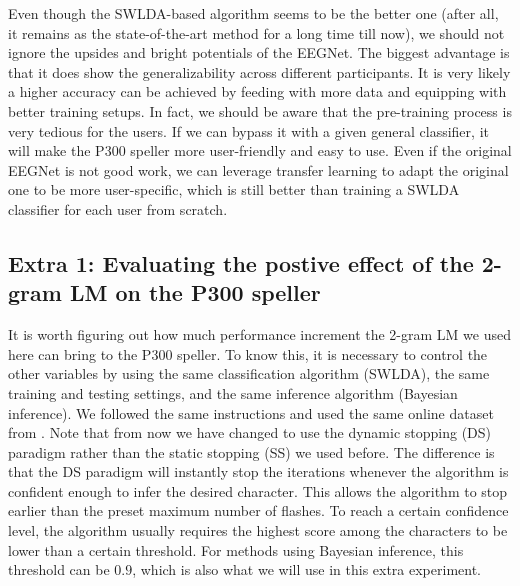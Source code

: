 \documentclass{article}
\begin{document}
\vspace{-3mm}
Even though the SWLDA-based algorithm seems to be the better one (after all, it remains as the state-of-the-art method for a long time till now), we should not ignore the upsides and bright potentials of the EEGNet. The biggest advantage is that it does show the generalizability across different participants. It is very likely a higher accuracy can be achieved by feeding with more data and equipping with better training setups. In fact, we should be aware that the pre-training process is very tedious for the users. If we can bypass it with a given general classifier, it will make the P300 speller more user-friendly and easy to use. Even if the original EEGNet is not good work, we can leverage transfer learning to adapt the original one to be more user-specific, which is still better than training a SWLDA classifier for each user from scratch.


\subsection{Extra 1: Evaluating the postive effect of the 2-gram LM on the P300 speller}
It is worth figuring out how much performance increment the 2-gram LM we used here can bring to the P300 speller. To know this, it is necessary to control the other variables by using the same classification algorithm (SWLDA), the same training and testing settings, and the same inference algorithm (Bayesian inference). We followed the same instructions and used the same online dataset from \cite{mainsah2014utilizing}. Note that from now we have changed to use the dynamic stopping (DS) paradigm rather than the static stopping (SS) we used before. The difference is that the DS paradigm will instantly stop the iterations whenever the algorithm is confident enough to infer the desired character. This allows the algorithm to stop earlier than the preset maximum number of flashes. To reach a certain confidence level, the algorithm usually requires the highest score among the characters to be lower than a certain threshold. For methods using Bayesian inference, this threshold can be $0.9$, which is also what we will use in this extra experiment.
\end{document}
